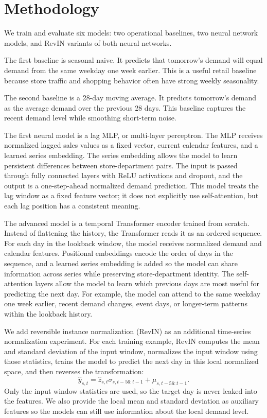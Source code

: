 \documentclass[11pt]{article}
\begin{document}
\section{Methodology}

We train and evaluate six models: two operational baselines, two neural network models, and RevIN variants of both neural networks.

The first baseline is seasonal naive. It predicts that tomorrow's demand will equal demand from the same weekday one week earlier. This is a useful retail baseline because store traffic and shopping behavior often have strong weekly seasonality.

The second baseline is a 28-day moving average. It predicts tomorrow's demand as the average demand over the previous 28 days. This baseline captures the recent demand level while smoothing short-term noise.

The first neural model is a lag MLP, or multi-layer perceptron. The MLP receives normalized lagged sales values as a fixed vector, current calendar features, and a learned series embedding. The series embedding allows the model to learn persistent differences between store-department pairs. The input is passed through fully connected layers with ReLU activations and dropout, and the output is a one-step-ahead normalized demand prediction. This model treats the lag window as a fixed feature vector; it does not explicitly use self-attention, but each lag position has a consistent meaning.

The advanced model is a temporal Transformer encoder trained from scratch. Instead of flattening the history, the Transformer reads it as an ordered sequence. For each day in the lookback window, the model receives normalized demand and calendar features. Positional embeddings encode the order of days in the sequence, and a learned series embedding is added so the model can share information across series while preserving store-department identity. The self-attention layers allow the model to learn which previous days are most useful for predicting the next day. For example, the model can attend to the same weekday one week earlier, recent demand changes, event days, or longer-term patterns within the lookback history.

We add reversible instance normalization (RevIN) as an additional time-series normalization experiment. For each training example, RevIN computes the mean and standard deviation of the input window, normalizes the input window using those statistics, trains the model to predict the next day in this local normalized space, and then reverses the transformation:
\begin{equation}
    \hat{y}_{s,t} = \hat{z}_{s,t}\sigma_{s,t-56:t-1} + \mu_{s,t-56:t-1}.
\end{equation}
Only the input window statistics are used, so the target day is never leaked into the features. We also provide the local mean and standard deviation as auxiliary features so the models can still use information about the local demand level.
\end{document}

